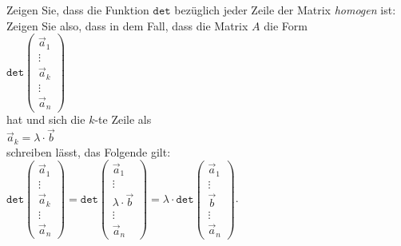 \exercise 
Zeigen Sie, dass die Funktion $\mathtt{det}$ bez\"uglich jeder Zeile der Matrix \emph{homogen} ist: Zeigen Sie
also, dass in dem Fall, dass die Matrix $A$ die Form
\\[0.2cm]
\hspace*{1.3cm}
$\mathtt{det}\left(
  \begin{array}{ll}
    \vec{a}_1 \\ \vdots \\ \vec{a}_k \\ \vdots \\ \vec{a}_n
  \end{array} \right)
$
\\[0.2cm]
hat und sich die $k$-te Zeile als 
\\[0.2cm]
\hspace*{1.3cm}
$\vec{a}_k = \lambda \cdot \vec{b}$
\\[0.2cm]
schreiben l\"asst, das Folgende gilt:
  \\[0.2cm]
  \hspace*{1.3cm}
$\mathtt{det}\left(
  \begin{array}{c}
    \vec{a}_1 \\ \vdots \\ \vec{a}_k \\ \vdots \\ \vec{a}_n
  \end{array} 
  \right) =
\mathtt{det}\left(
  \begin{array}{c}
    \vec{a}_1 \\ \vdots \\ \lambda \cdot \vec{b} \\ \vdots \\ \vec{a}_n
  \end{array} 
  \right)
 = \lambda \cdot \mathtt{det}\left(
  \begin{array}{c}
    \vec{a}_1 \\ \vdots \\ \vec{b} \\ \vdots \\ \vec{a}_n
  \end{array}  \right)
$.
\eoxs


